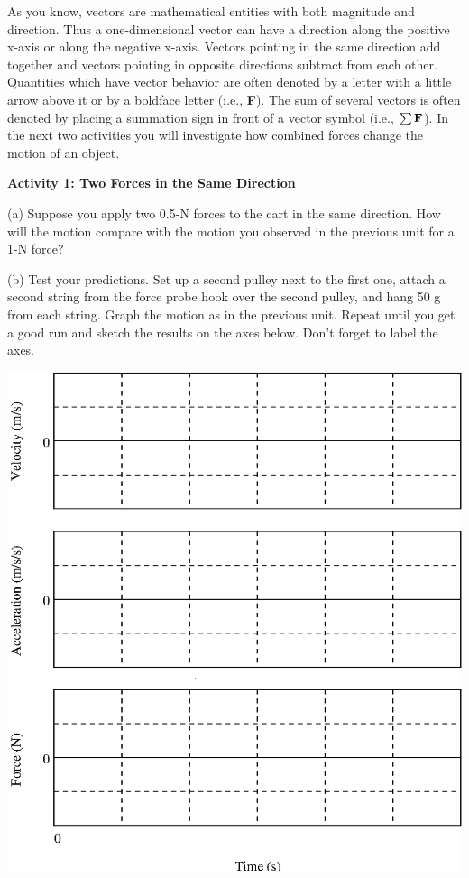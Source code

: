 As you know, vectors are mathematical entities with both magnitude and
direction. Thus a one-dimensional vector can have a direction along the positive
x-axis or along the negative x-axis. Vectors pointing in the same direction
add together and vectors pointing in opposite directions subtract from each
other. Quantities which have vector behavior are often denoted by a letter with
a little arrow above it or by a boldface letter (i.e., \textbf{F}). The sum of
several vectors is often denoted by placing a summation sign in front of a vector
symbol (i.e., \( \sum {\bf F}  \)). In the next two activities you will
investigate how combined forces change the motion of an object.

\textbf{Activity 1: Two Forces in the Same Direction}

(a) Suppose you apply two 0.5-N forces to the cart in the same direction. How
will the motion compare with the motion you observed in the previous unit for
a 1-N force?
\vspace{10mm}

(b) Test your predictions. Set up a second pulley next to the first one, attach
a second string from the force probe hook over the second pulley, and hang 50
g from each string. Graph the motion as in the previous unit. Repeat until you
get a good run and sketch the results on the axes below. Don't forget to label
the axes.

\vspace{0.3cm}
{\par\centering \includegraphics{force2/force2_fig4.eps} \par}
\vspace{0.3cm}

